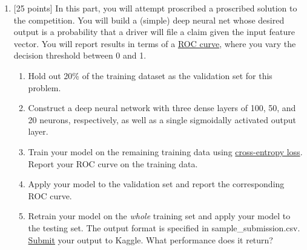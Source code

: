 \documentclass[12pt]{article}
\newenvironment{problem}[2][Problem:]{\begin{trivlist}
\item[\hskip \labelsep {\bfseries #1}\hskip \labelsep {\bfseries #2.}]}{\end{trivlist}}
\begin{document}
\begin{problem}{Porto Seguro Dataset [65 points]}
\begin{enumerate}

    \item {[25 points]} \label{3}
    In this part, you will attempt proscribed a proscribed solution to the competition. 
    You will build a (simple) deep neural net whose desired output is a probability that a driver will file a claim given the input feature vector. 
    You will report results in terms of a \href{https://en.wikipedia.org/wiki/Receiver_operating_characteristic}{ROC curve}, where you vary the decision threshold between 0 and 1. 
    \begin{enumerate}
    	\item Hold out 20\% of the training dataset as the validation set for this problem.
    	\item Construct a deep neural network with three dense layers of 100, 50, and 20 neurons, respectively, as well as a single sigmoidally activated output layer.
	\item Train your model on the remaining training data using \href{https://en.wikipedia.org/wiki/Cross_entropy}{cross-entropy loss}. Report your ROC curve on the training data.
	\item Apply your model to the validation set and report the corresponding ROC curve. 
	\item Retrain your model on the \emph{whole} training set and apply your model to the testing set. The output format is specified in sample\_submission.csv. \href{https://www.kaggle.com/c/porto-seguro-safe-driver-prediction/submit}{Submit} your output to Kaggle. What performance does it return?
    \end{enumerate}


\end{enumerate}
\end{problem}
\end{document}
